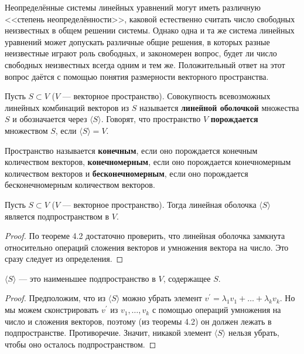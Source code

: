 \begin{remark}[из Винберга]
    Неопределённые системы линейных уравнений могут иметь различную <<степень неопределённости>>, каковой естественно считать число свободных неизвестных в общем решении системы. Однако одна и та же система линейных уравнений может допускать различные общие решения, в которых разные неизвестные играют роль свободных, и закономерен вопрос, будет ли число свободных неизвестных всегда одним и тем же. Положительный ответ на этот вопрос даётся с помощью понятия размерности векторного пространства.
\end{remark}

\begin{definition}
    Пусть $S \subset V$ ($V$ --- векторное пространство). Совокупность всевозможных линейных комбинаций векторов из $S$ называется \textbf{линейной оболочкой} множества $S$ и обозначается через $\langle S\rangle$. Говорят, что пространство $V$ \textbf{порождается} множеством $S$, если $\langle S\rangle = V$.
\end{definition}

\begin{definition}
    Пространство называется \textbf{конечным}, если оно порождается конечным количеством векторов, \textbf{конечномерным}, если оно порождается конечномерным количеством векторов и \textbf{бесконечномерным}, если оно порождается бесконечномерным количеством векторов.
\end{definition}

\begin{theorem}
    Пусть $S \subset V$ ($V$ --- векторное пространство). Тогда линейная оболочка $\langle S\rangle$ является подпространством в $V$.
\end{theorem}

\begin{proof}
    По теореме 4.2 достаточно проверить, что линейная оболочка замкнута относительно операций сложения векторов и умножения вектора на число. Это сразу следует из определения.
\end{proof}

\begin{statement}
    $\langle S\rangle$ --- это наименьшее подпространство в $V$, содержащее $S$.
\end{statement}

\begin{proof}
    Предположим, что из $\langle S\rangle$ можно убрать элемент $v^\prime = \lambda_1v_1 + \ldots + \lambda_kv_k$. Но мы можем сконстрировать $v^\prime$ из $v_1, \ldots, v_k$ с помощью операций умножения на число и сложения векторов, поэтому (из теоремы 4.2) он должен лежать в подпространстве. Противоречие. Значит, никакой элемент $\langle S\rangle$ нельзя убрать, чтобы оно осталось подпространством.
\end{proof}

